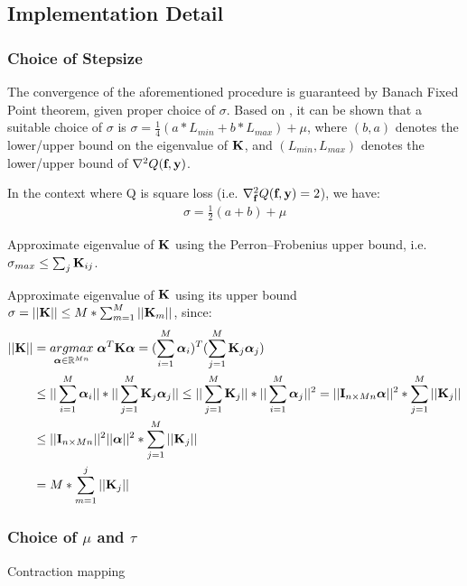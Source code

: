 \documentclass[tablecaption=bottom,wcp]{jmlr} %
\begin{document}
\subsection{Implementation Detail}

\subsubsection{Choice of Stepsize}

The convergence of the aforementioned procedure is guaranteed by Banach Fixed Point theorem, given proper choice of $\sigma$. Based on \citet{jordan-mkl-2004}, it can be shown that a suitable choice of $\sigma$ is $\sigma = \frac{1}{4}(a*L_{min} + b*L_{max}) + \mu$, where $(b, a)$ denotes the lower/upper bound on the eigenvalue of ${\bf K}$, and $(L_{min}, L_{max})$ denotes the lower/upper bound of $\nabla^2 Q(\textbf{f}, {\bf y})$.

In the context where  Q is square loss (i.e. $\nabla^2_{\textbf{f}} Q(\textbf{f}, {\bf y}) = 2$), we have:
\begin{align*}
\sigma = \frac{1}{2}(a + b) + \mu
\end{align*}

Approximate eigenvalue of ${\bf K}$ using the Perron–Frobenius upper bound, i.e. $\sigma_{max} \leq \sum_j {\bf K}_{ij}$.

Approximate eigenvalue of ${\bf K}$ using its upper bound 
$\sigma = ||{\bf K}|| \leq M*\sum_{m=1}^M ||{\bf K}_m||$, since:
\begin{align*}
||{\bf K}|| &= \underset{\boldsymbol{\alpha} \in {\mathbb R}^{Mn}}{argmax} \;
\boldsymbol{\alpha}^T {\bf K} \boldsymbol{\alpha} 
= (\sum_{i=1}^M \boldsymbol{\alpha}_i)^T 
(\sum_{j=1}^M {\bf K}_j \boldsymbol{\alpha}_j) \\
& \leq ||\sum_{i=1}^M \boldsymbol{\alpha}_i|| * ||\sum_{j=1}^M {\bf K}_j \boldsymbol{\alpha}_j|| 
\leq ||\sum_{j=1}^M {\bf K}_j || * ||\sum_{i=1}^M  \boldsymbol{\alpha}_j||^2 
=  ||{\bf I}_{n \times Mn}  \boldsymbol{\alpha}||^2 * \sum_{j=1}^M  ||{\bf K}_j || \\
&\leq  ||{\bf I}_{n \times Mn} ||^2  ||\boldsymbol{\alpha}||^2 *\sum_{j=1}^M  ||{\bf K}_j || \\
& = M * \sum_{m=1}^j ||{\bf K}_j||
\end{align*}

\subsubsection{Choice of $\mu$ and $\tau$}
\citet{Zou-2005}

\citet{rosasco-prox-2009}


Contraction mapping
\end{document}
